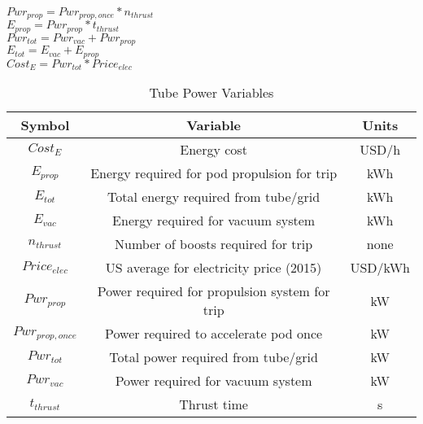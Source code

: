 $Pwr_{prop} = Pwr_{prop,once} * n_{thrust}$\\
$E_{prop} = Pwr_{prop} * t_{thrust}$\\
$Pwr_{tot} = Pwr_{vac} + Pwr_{prop}$\\
$E_{tot} = E_{vac} + E_{prop}$\\
$Cost_{E} = Pwr_{tot} * Price_{elec}$\\

\begin{table}[ht]
\caption{Tube Power Variables} %
\centering %
\begin{tabular}{c c c} %
\hline\hline %
Symbol & Variable & Units \\ [0.5ex] %
\hline %
$Cost_{E}$ & Energy cost & USD/h\\

$E_{prop}$ & Energy required for pod propulsion for trip& kWh\\
$E_{tot}$ & Total energy required from tube/grid & kWh\\
$E_{vac}$&Energy required for vacuum system & kWh\\

$n_{thrust}$ & Number of boosts required for trip & none\\
$Price_{elec}$&US average for electricity price (2015)& USD/kWh\\
$Pwr_{prop}$ & Power required for propulsion system for trip & kW\\
$ Pwr_{prop,once}$ & Power required to accelerate pod once & kW\\

$Pwr_{tot}$ & Total power required from tube/grid & kW\\
$Pwr_{vac}$ & Power required for vacuum system & kW\\

$t_{thrust}$ & Thrust time & s\\

\hline %
\end{tabular}
\label{table:nonlin} %
\end{table}
